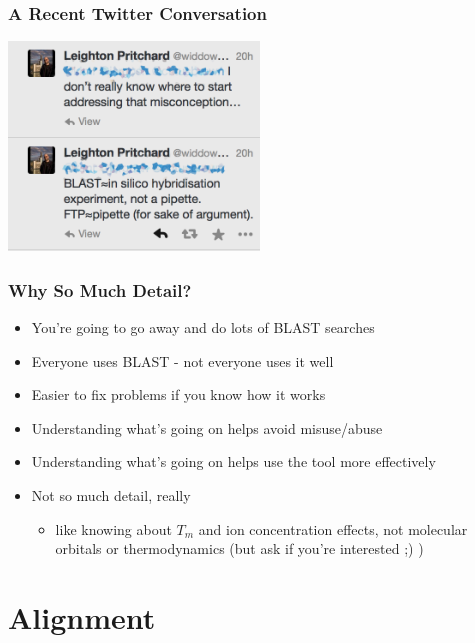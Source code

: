 \begin{frame}
  \frametitle{A Recent Twitter Conversation}
  \begin{center}
    \includegraphics[width=0.5\textwidth]{images/blast_twitter2} 
  \end{center}
\end{frame}      

\begin{frame}
  \frametitle{Why So Much Detail?}
  \begin{itemize}
    \item You're going to go away and do lots of BLAST searches
    \item Everyone uses BLAST - not everyone uses it well
    \item Easier to fix problems if you know how it works
    \item Understanding what's going on helps avoid misuse/abuse
    \item Understanding what's going on helps use the tool more effectively
    \item Not so much detail, really
    \begin{itemize}
      \item like knowing about $T_m$ and ion concentration effects, not molecular 
               orbitals or thermodynamics (but ask if you're interested ;) )
    \end{itemize}
  \end{itemize}
\end{frame}      

  
\section{Alignment} 
  
  
  

